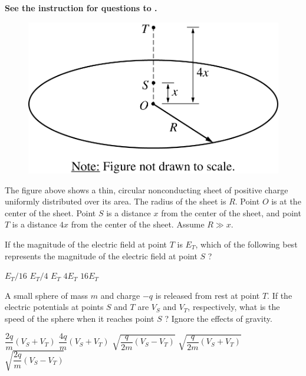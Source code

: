 \textbf{See the instruction for questions  to .}

\begin{figure}[H]
    \centering
    \includegraphics[scale=0.3]{images/img-005-005.png}
\end{figure}

The figure above shows a thin, circular nonconducting sheet of positive charge uniformly distributed over its area. The radius of the sheet is $R$. Point $O$ is at the center of the sheet. Point $S$ is a distance $x$ from the center of the sheet, and point $T$ is a distance $4 x$ from the center of the sheet.
Assume $R \gg x$.

\begin{questions}\setcounter{question}{9}\question
If the magnitude of the electric field at point $T$ is $E_{T}$, which of the following best represents the magnitude of the electric field at point $S$ ?

\begin{oneparchoices}
\choice $E_{T} / 16$
\choice $E_{T} / 4$
\choice $E_{T}$
\choice $4 E_{T}$
\choice $16 E_{T}$
\end{oneparchoices}\end{questions}

\begin{questions}\setcounter{question}{10}\question
A small sphere of mass $m$ and charge $-q$ is released from rest at point $T$. If the electric potentials at points $S$ and $T$ are $V_{S}$ and $V_{T}$, respectively, what is the speed of the sphere when it reaches point $S$ ? Ignore the effects of gravity.

\begin{choices}
\choice $\dfrac{2 q}{m}\left(V_{S}+V_{T}\right)$
\choice $\dfrac{4 q}{m}\left(V_{S}+V_{T}\right)$
\choice $\sqrt{\dfrac{q}{2 m}\left(V_{S}-V_{T}\right)}$
\choice $\sqrt{\dfrac{q}{2 m}\left(V_{S}+V_{T}\right)}$
\choice $\sqrt{\dfrac{2 q}{m}\left(V_{S}-V_{T}\right)}$
\end{choices}\end{questions}
